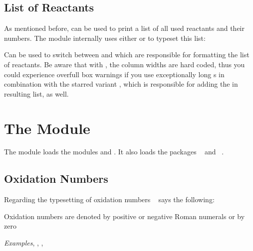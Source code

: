 \documentclass{chemmacros-manual}
\begin{document}
\begin{example}
  \par
  \par
\end{example}

\subsection{List of Reactants}\label{sec:list-of-reactants}
As mentioned before,  can be used to print a list of all
used reactants and their numbers. The  module internally
uses either  or  to typeset this list:
\begin{options}
    Can be used to switch between  and  which
    are responsible for formatting the list of reactants. Be aware that with
    , the column widths are hard coded, thus you could
    experience overfull box warnings if you use exceptionally long s
    in combination with the starred variant \sarg, which is
    responsible for adding the  in resulting list, as well.
\end{options}

\section{The  Module}\label{sec:redox-module}

The  module loads the modules  and
. It also loads the packages
~\cite{pkg:mathtools} and ~\cite{pkg:relsize}.

\subsection{Oxidation Numbers}\label{sec:oxidation-numbers}

Regarding the typesetting of oxidation numbers
~\cite{iupac:greenbook} says the following:
\begin{cnltxquote}
  Oxidation numbers are denoted by positive or negative Roman numerals or by
  zero \textelp{}

  \textit{Examples}\quad {}, , ,
\end{cnltxquote}
\end{document}
